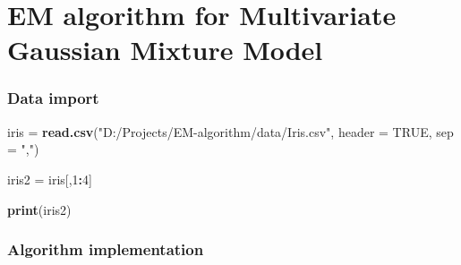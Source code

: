 \documentclass[
]{article}
\author{}
\date{\vspace{-2.5em}}
\newenvironment{Shaded}{\begin{snugshade}}{\end{snugshade}}
\newcommand{\AttributeTok}[1]{\textcolor[rgb]{0.13,0.29,0.53}{#1}}
\newcommand{\ConstantTok}[1]{\textcolor[rgb]{0.56,0.35,0.01}{#1}}
\newcommand{\DecValTok}[1]{\textcolor[rgb]{0.00,0.00,0.81}{#1}}
\newcommand{\FunctionTok}[1]{\textcolor[rgb]{0.13,0.29,0.53}{\textbf{#1}}}
\newcommand{\NormalTok}[1]{#1}
\newcommand{\OtherTok}[1]{\textcolor[rgb]{0.56,0.35,0.01}{#1}}
\newcommand{\SpecialCharTok}[1]{\textcolor[rgb]{0.81,0.36,0.00}{\textbf{#1}}}
\newcommand{\StringTok}[1]{\textcolor[rgb]{0.31,0.60,0.02}{#1}}
\begin{document}
\section{EM algorithm for Multivariate Gaussian Mixture
Model}\label{em-algorithm-for-multivariate-gaussian-mixture-model}

\subsubsection{Data import}\label{data-import}

\begin{Shaded}
\begin{Highlighting}[]
\NormalTok{iris }\OtherTok{=} \FunctionTok{read.csv}\NormalTok{(}\StringTok{"D:/Projects/EM{-}algorithm/data/Iris.csv"}\NormalTok{, }\AttributeTok{header =} \ConstantTok{TRUE}\NormalTok{, }\AttributeTok{sep =} \StringTok{","}\NormalTok{) }

\NormalTok{iris2 }\OtherTok{=}\NormalTok{ iris[,}\DecValTok{1}\SpecialCharTok{:}\DecValTok{4}\NormalTok{]}

\FunctionTok{print}\NormalTok{(iris2)}
\end{Highlighting}
\end{Shaded}
\subsubsection{Algorithm implementation}\label{algorithm-implementation}
\end{document}
